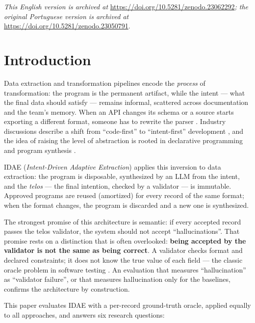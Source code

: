 \documentclass[sigconf,nonacm]{acmart}
\begin{document}
\noindent\textit{This English version is archived at} \url{https://doi.org/10.5281/zenodo.23062292}\textit{; the original Portuguese version is archived at} \url{https://doi.org/10.5281/zenodo.23050791}.

\section{Introduction}

Data extraction and transformation pipelines encode the \textit{process} of transformation: the program is the permanent artifact, while the intent --- what the final data should satisfy --- remains informal, scattered across documentation and the team's memory. When an API changes its schema or a source starts exporting a different format, someone has to rewrite the parser \cite{salehie2009self}. Industry discussions describe a shift from ``code-first'' to ``intent-first'' development \cite{shoukry2026future}, and the idea of raising the level of abstraction is rooted in declarative programming \cite{lloyd1994practical} and program synthesis \cite{gulwani2017program}.

IDAE (\textit{Intent-Driven Adaptive Extraction}) applies this inversion to data extraction: the program is disposable, synthesized by an LLM from the intent, and the \textit{telos} --- the final intention, checked by a validator --- is immutable. Approved programs are reused (amortized) for every record of the same format; when the format changes, the program is discarded and a new one is synthesized.

The strongest promise of this architecture is semantic: if every accepted record passes the telos validator, the system should not accept ``hallucinations''. That promise rests on a distinction that is often overlooked: \textbf{being accepted by the validator is not the same as being correct}. A validator checks format and declared constraints; it does not know the true value of each field --- the classic oracle problem in software testing \cite{barr2015oracle}. An evaluation that measures ``hallucination'' as ``validator failure'', or that measures hallucination only for the baselines, confirms the architecture by construction.

This paper evaluates IDAE with a per-record ground-truth oracle, applied equally to all approaches, and answers six research questions:
\end{document}
